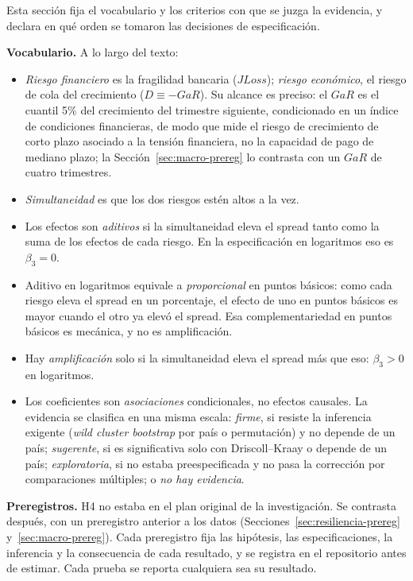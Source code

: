Esta sección fija el vocabulario y los criterios con que se juzga la evidencia, y declara en qué orden se tomaron las decisiones de especificación.

\begin{mdframed}[linewidth=0.6pt,innertopmargin=6pt,innerbottommargin=6pt,innerleftmargin=8pt,innerrightmargin=8pt]
\small\textbf{Vocabulario.} A lo largo del texto:
\begin{itemize}\setlength\itemsep{1pt}
    \item \emph{Riesgo financiero} es la fragilidad bancaria ($JLoss$); \emph{riesgo económico}, el riesgo de cola del crecimiento ($D\equiv-GaR$). Su alcance es preciso: el $GaR$ es el cuantil 5\% del crecimiento del trimestre siguiente, condicionado en un índice de condiciones financieras, de modo que mide el riesgo de crecimiento de corto plazo asociado a la tensión financiera, no la capacidad de pago de mediano plazo; la Sección~\ref{sec:macro-prereg} lo contrasta con un $GaR$ de cuatro trimestres.
    \item \emph{Simultaneidad} es que los dos riesgos estén altos a la vez.
    \item Los efectos son \emph{aditivos} si la simultaneidad eleva el spread tanto como la suma de los efectos de cada riesgo. En la especificación en logaritmos eso es $\beta_3=0$.
    \item Aditivo en logaritmos equivale a \emph{proporcional} en puntos básicos: como cada riesgo eleva el spread en un porcentaje, el efecto de uno en puntos básicos es mayor cuando el otro ya elevó el spread. Esa complementariedad en puntos básicos es mecánica, y no es amplificación.
    \item Hay \emph{amplificación} solo si la simultaneidad eleva el spread más que eso: $\beta_3>0$ en logaritmos.
    \item Los coeficientes son \emph{asociaciones} condicionales, no efectos causales. La evidencia se clasifica en una misma escala: \emph{firme}, si resiste la inferencia exigente (\textit{wild cluster bootstrap} por país o permutación) y no depende de un país; \emph{sugerente}, si es significativa solo con Driscoll--Kraay o depende de un país; \emph{exploratoria}, si no estaba preespecificada y no pasa la corrección por comparaciones múltiples; o \emph{no hay evidencia}.
\end{itemize}
\end{mdframed}

\textbf{Preregistros.} H4 no estaba en el plan original de la investigación. Se contrasta después, con un preregistro anterior a los datos (Secciones~\ref{sec:resiliencia-prereg} y~\ref{sec:macro-prereg}). Cada preregistro fija las hipótesis, las especificaciones, la inferencia y la consecuencia de cada resultado, y se registra en el repositorio antes de estimar. Cada prueba se reporta cualquiera sea su resultado.

